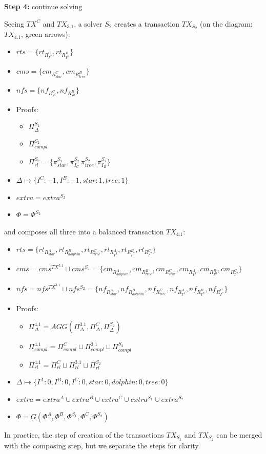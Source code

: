 \textbf{Step 4:} continue solving

Seeing $TX^C$ and $TX_{3.1}$, a solver $S_2$ creates a transaction $TX_{S_2}$ (on the diagram: $TX_{4.1}$, green arrows):

\begin{itemize}
    \item $rts = \{rt_{R^C_{I^{C}}}, rt_{R^B_{I^{B}}}\}$
    \item $cms = \{
    cm_{R^C_{star}}, cm_{R^B_{tree}}\}$
    \item $nfs = \{nf_{R^C_{I^{C}}}, nf_{R^B_{I^{B}}}\}$
    \item Proofs:
    \begin{itemize}
        \item $\Pi^{S_2}_{\Delta}$
        \item $\Pi^{S_2}_{compl}$
        \item $\Pi^{S_2}_{rl} = \{\pi^{S_2}_{star}, \pi^{S_2}_{I_C}\, \pi^{S_2}_{tree}, \pi^{S_2}_{I_B}\}$
    \end{itemize}
    \item $\Delta \mapsto \{I^{C}: -1, I^{B}: -1, star: 1, tree: 1\}$
    \item $extra = extra^{S_2}$
    \item $\Phi = \Phi^{S_2}$
\end{itemize}

and composes all three into a balanced transaction $TX_{4.1}$:

\begin{itemize}
    \item $rts = \{rt_{R^A_{star}}, rt_{R^B_{dolphin}}, rt_{R^C_{tree}}, rt_{R^A_{I^{A}}}, rt_{R^B_{I^{B}}}, rt_{R^C_{I^{C}}}\}$
    \item $cms = cms^{TX^{3.1}} \sqcup cms^{S_2} =\{cm_{R^A_{dolphin}}, cm_{R^B_{tree}}, cm_{R^C_{star}}, cm_{R^A_{I^{A}}}, cm_{R^B_{I^{B}}}, cm_{R^C_{I^{C}}}\}$
    \item $nfs = nfs^{TX^{3.1}} \sqcup nfs^{S_2} = \{nf_{R^A_{star}}, nf_{R^B_{dolphin}}, nf_{R^C_{tree}}, nf_{R^A_{I^{A}}}, nf_{R^B_{I^{B}}}, nf_{R^C_{I^{C}}}\}$
    \item Proofs:
    \begin{itemize}
        \item $\Pi^{4.1}_{\Delta} = AGG(\Pi^{3.1}_{\Delta}, \Pi^{C}_{\Delta}, \Pi^{S_2}_{\Delta})$
        \item $\Pi^{4.1}_{compl} = \Pi^C_{compl} \sqcup \Pi^{3.1}_{compl} \sqcup \Pi^{S_2}_{compl}$
        \item $\Pi^{4.1}_{rl} = \Pi^C_{rl} \sqcup \Pi^{3.1}_{rl} \sqcup \Pi^{S_2}_{rl}$
    \end{itemize}
    \item $\Delta \mapsto \{I^{A}: 0, I^{B}: 0, I^{C}: 0, star: 0, dolphin: 0, tree: 0\}$
    \item $extra = extra^A \cup extra^B \cup extra^C \cup extra^{S_1} \cup extra^{S_2}$
    \item $\Phi = G(\Phi^A, \Phi^B, \Phi^{S_1}, \Phi^C, \Phi^{S_2})$
\end{itemize}

In practice, the step of creation of the transactions $TX_{S_1}$ and $TX_{S_2}$ can be merged with the composing step, but we separate the steps for clarity.
